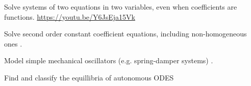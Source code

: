 \begin{readinessAssuranceResources}
\item Solve systems of two equations in two variables, even when coefficients are functions. \url{https://youtu.be/Y6JsEja15Vk}
\item Solve second order constant coefficient equations, including non-homogeneous ones .
\item Model simple mechanical oscillators (e.g. spring-damper systems)  .
\item Find and classify the equillibria of autonomous ODES 
\end{readinessAssuranceResources}
